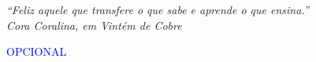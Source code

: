 
\renewcommand{\epigraphname}{EPÍGRAFE}

\begin{epigrafe}

\begin{flushright}
\textit{
``Feliz aquele que transfere o que sabe e aprende o que ensina.'' \\ Cora Coralina, em Vintém de Cobre
}

\textcolor{blue}{OPCIONAL}
\end{flushright}

\end{epigrafe}


